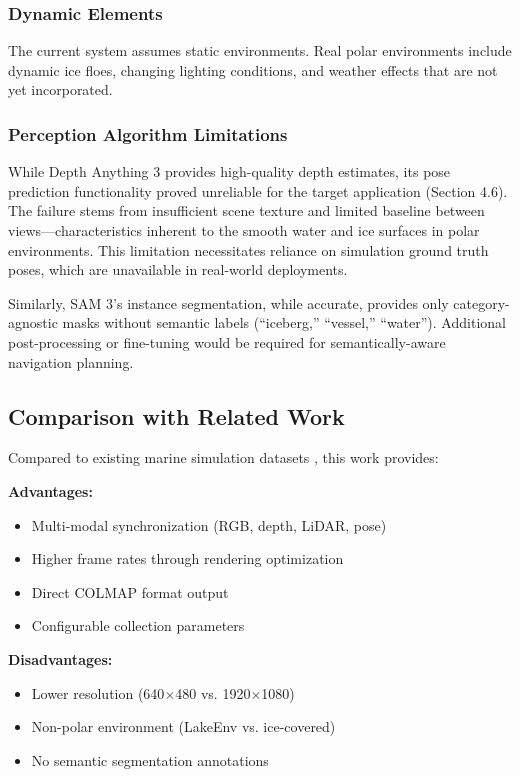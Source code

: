 \subsubsection{Dynamic Elements}

The current system assumes static environments. Real polar environments include dynamic ice floes, changing lighting conditions, and weather effects that are not yet incorporated.

\subsubsection{Perception Algorithm Limitations}

While Depth Anything 3 provides high-quality depth estimates, its pose prediction functionality proved unreliable for the target application (Section 4.6). The failure stems from insufficient scene texture and limited baseline between views---characteristics inherent to the smooth water and ice surfaces in polar environments. This limitation necessitates reliance on simulation ground truth poses, which are unavailable in real-world deployments.

Similarly, SAM 3's instance segmentation, while accurate, provides only category-agnostic masks without semantic labels (``iceberg,'' ``vessel,'' ``water''). Additional post-processing or fine-tuning would be required for semantically-aware navigation planning.

\subsection{Comparison with Related Work}

Compared to existing marine simulation datasets \parencite{bingham2019virtual, ebadi2020lakes}, this work provides:

\textbf{Advantages:}
\begin{itemize}
    \item Multi-modal synchronization (RGB, depth, LiDAR, pose)
    \item Higher frame rates through rendering optimization
    \item Direct COLMAP format output
    \item Configurable collection parameters
\end{itemize}

\textbf{Disadvantages:}
\begin{itemize}
    \item Lower resolution (640$\times$480 vs. 1920$\times$1080)
    \item Non-polar environment (LakeEnv vs. ice-covered)
    \item No semantic segmentation annotations
\end{itemize}

